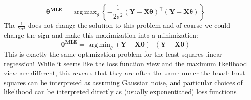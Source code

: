 \documentclass[twoside]{article}
\DeclareMathOperator*{\argmax}{arg\,max}
\DeclareMathOperator*{\argmin}{arg\,min}
\begin{document}
\begin{equation}
    \boldsymbol{\theta^{\text{MLE}}} = \argmax_{\theta}\left\{ -\frac{1}{2\sigma^2}(\boldsymbol{Y} - \boldsymbol{X\theta})^{\intercal}(\boldsymbol{Y} - \boldsymbol{X\theta}) \right\}
\end{equation}
The $\frac{1}{2\sigma^2}$ does not change the solution to this problem and of course we could change the sign and make
this maximization into a minimization:
\begin{equation*}
    \boldsymbol{\theta^{\text{MLE}}} = \argmin_{\theta}(\boldsymbol{Y} - \boldsymbol{X\theta})^{\intercal}(\boldsymbol{Y} - \boldsymbol{X\theta})
\end{equation*}
This is exactly the same optimization problem for the least-squares linear regression! While it seems like the loss function view and the maximum likelihood view are different, this reveals that they are often the same under the hood: least squares can be interpreted as assuming Gaussian noise, and particular choices of likelihood can be interpreted directly as (usually exponentiated) loss functions.
\end{document}
